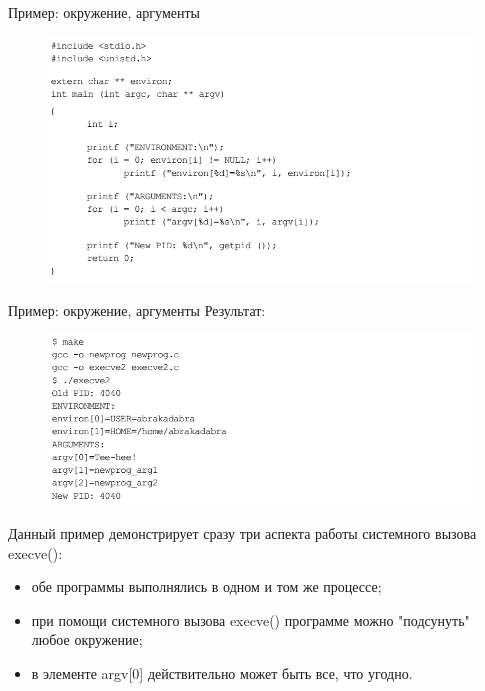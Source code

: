 \documentclass[xcolor=table]{beamer}
\begin{document}
\begin{frame}{Пример: окружение, аргументы}
\begin{figure}[h]
\centering
\includegraphics[scale=0.5]{images/lec07-pic38.png}
\end{figure}
\end{frame}

\begin{frame}{Пример: окружение, аргументы}
Результат:
\begin{figure}[h]
\centering
\includegraphics[scale=0.5]{images/lec07-pic39.png}
\end{figure}
Данный пример демонстрирует сразу три аспекта работы системного вызова
execve():
\begin{itemize}
\item обе программы выполнялись в одном и том же процессе;
\item при помощи системного вызова execve() программе можно "подсунуть" любое окружение;
\item в элементе argv[0] действительно может быть все, что угодно.
\end{itemize}
\end{frame}
\end{document}
